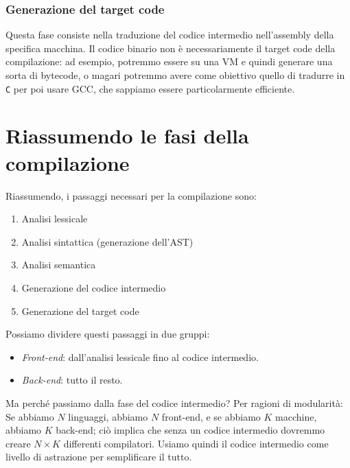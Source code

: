 \documentclass[class=book, crop=false, oneside, 12pt]{standalone}
\begin{document}
\subsubsection{Generazione del target code}
Questa fase consiste nella traduzione del codice intermedio nell’assembly della specifica macchina. Il codice binario non è necessariamente il target code della compilazione: ad esempio, potremmo essere su una VM e quindi generare una sorta di bytecode, o magari potremmo avere come obiettivo quello di tradurre in \texttt{C} per poi usare GCC, che sappiamo essere particolarmente efficiente.

\section{Riassumendo le fasi della compilazione}
Riassumendo, i passaggi necessari per la compilazione sono:
\begin{enumerate}
    \item Analisi lessicale
    \item Analisi sintattica (generazione dell'AST)
    \item Analisi semantica
    \item Generazione del codice intermedio
    \item Generazione del target code
\end{enumerate}
Possiamo dividere questi passaggi in due gruppi:
\begin{itemize}[]
    \item \emph{Front-end}: dall’analisi lessicale fino al codice intermedio.
    \item \emph{Back-end}: tutto il resto.
\end{itemize}
Ma perché passiamo dalla fase del codice intermedio? Per ragioni di modularità:
Se abbiamo \(N\) linguaggi, abbiamo \(N\) front-end, e se abbiamo \(K\) macchine, abbiamo \(K\) back-end; ciò implica che senza un codice intermedio dovremmo creare \(N \times K\) differenti compilatori. Usiamo quindi il codice intermedio come livello di astrazione per semplificare il tutto. 
\end{document}
